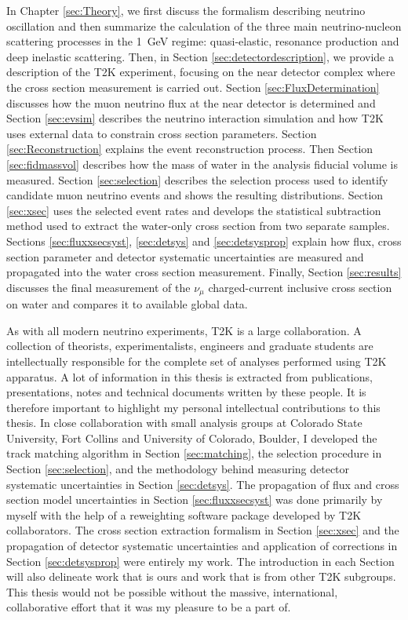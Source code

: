 In Chapter \ref{sec:Theory}, we first discuss the formalism describing neutrino oscillation and then summarize the calculation of the three main neutrino-nucleon scattering processes in the 1~GeV regime: quasi-elastic, resonance production and deep inelastic scattering. Then, in Section \ref{sec:detectordescription}, we provide a description of the T2K experiment, focusing on the near detector complex where the cross section measurement is carried out. Section \ref{sec:FluxDetermination} discusses how the muon neutrino flux at the near detector is determined and Section \ref{sec:evsim} describes the neutrino interaction simulation and how T2K uses external data to constrain cross section parameters. Section \ref{sec:Reconstruction} explains the event reconstruction process. Then Section \ref{sec:fidmassvol} describes how the mass of water in the analysis fiducial volume is measured. Section \ref{sec:selection} describes the selection process used to identify candidate muon neutrino events and shows the resulting distributions. Section \ref{sec:xsec} uses the selected event rates and develops the statistical subtraction method used to extract the water-only cross section from two separate samples. Sections \ref{sec:fluxxsecsyst}, \ref{sec:detsys} and \ref{sec:detsysprop} explain how flux, cross section parameter and detector systematic uncertainties are measured and propagated into the water cross section measurement. Finally, Section \ref{sec:results} discusses the final measurement of the $\nu_\mu$ charged-current inclusive cross section on water and compares it to available global data. 

As with all modern neutrino experiments, T2K is a large collaboration. A collection of theorists, experimentalists, engineers and graduate students are intellectually responsible for the complete set of analyses performed using T2K apparatus. A lot of information in this thesis is extracted from publications, presentations, notes and technical documents written by these people. It is therefore important to highlight my personal intellectual contributions to this thesis. In close collaboration with small analysis groups at Colorado State University, Fort Collins and University of Colorado, Boulder, I developed the track matching algorithm in Section \ref{sec:matching}, the selection procedure in Section \ref{sec:selection}, and the methodology behind measuring detector systematic uncertainties in Section \ref{sec:detsys}. The propagation of flux and cross section model uncertainties in Section \ref{sec:fluxxsecsyst} was done primarily by myself with the help of a reweighting software package developed by T2K collaborators. The cross section extraction formalism in Section \ref{sec:xsec} and the propagation of detector systematic uncertainties and application of corrections in Section \ref{sec:detsysprop} were entirely my work. The introduction in each Section will also delineate work that is ours and work that is from other T2K subgroups. This thesis would not be possible without the massive, international, collaborative effort that it was my pleasure to be a part of.


